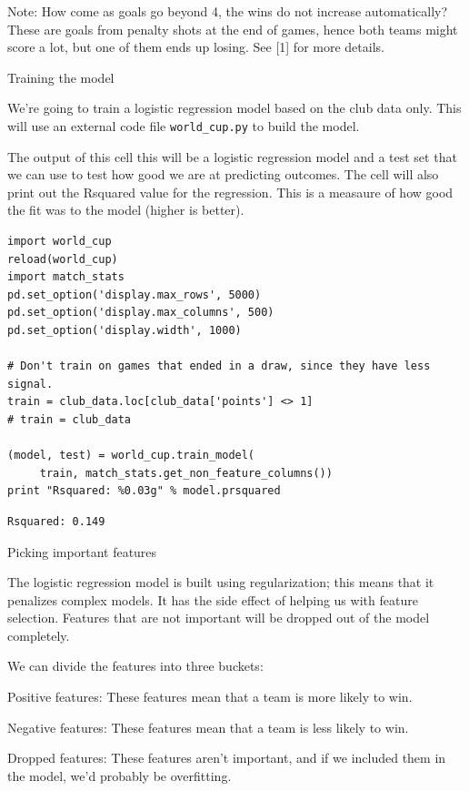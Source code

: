 \documentclass[12pt,fleqn]{article}\usepackage{common}
\begin{document}
Note: How come as goals go beyond 4, the wins do not increase
automatically? These are goals from penalty shots at the end of games,
hence both teams might score a lot, but one of them ends up losing. See [1]
for more details.

Training the model

We're going to train a logistic regression model based on the club data
only. This will use an external code file \verb!world_cup.py! to build the
model.

The output of this cell this will be a logistic regression model and a test
set that we can use to test how good we are at predicting outcomes. The
cell will also print out the Rsquared value for the regression. This is a
measaure of how good the fit was to the model (higher is better).

\begin{verbatim}
import world_cup
reload(world_cup)
import match_stats
pd.set_option('display.max_rows', 5000)
pd.set_option('display.max_columns', 500)
pd.set_option('display.width', 1000)

# Don't train on games that ended in a draw, since they have less signal.
train = club_data.loc[club_data['points'] <> 1] 
# train = club_data

(model, test) = world_cup.train_model(
     train, match_stats.get_non_feature_columns())
print "Rsquared: %0.03g" % model.prsquared
\end{verbatim}

\begin{verbatim}
Rsquared: 0.149
\end{verbatim}

Picking important features

The logistic regression model is built using regularization; this means
that it penalizes complex models. It has the side effect of helping us with
feature selection. Features that are not important will be dropped out of
the model completely.

We can divide the features into three buckets:

Positive features: These features mean that a team is more likely to win.

Negative features: These features mean that a team is less likely to win. 

Dropped features: These features aren't important, and if we included them
in the model, we'd probably be overfitting. 
\end{document}
